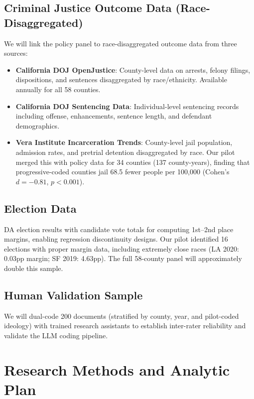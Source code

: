 \documentclass[12pt]{article}
\begin{document}
\subsection{Criminal Justice Outcome Data (Race-Disaggregated)}

We will link the policy panel to race-disaggregated outcome data from three sources:

\begin{itemize}
    \item \textbf{California DOJ OpenJustice}: County-level data on arrests, felony filings, dispositions, and sentences disaggregated by race/ethnicity. Available annually for all 58 counties.
    \item \textbf{California DOJ Sentencing Data}: Individual-level sentencing records including offense, enhancements, sentence length, and defendant demographics.
    \item \textbf{Vera Institute Incarceration Trends}: County-level jail population, admission rates, and pretrial detention disaggregated by race. Our pilot merged this with policy data for 34 counties (137 county-years), finding that progressive-coded counties jail 68.5 fewer people per 100,000 (Cohen's $d = -0.81$, $p < 0.001$).
\end{itemize}

\subsection{Election Data}

DA election results with candidate vote totals for computing 1st--2nd place margins, enabling regression discontinuity designs. Our pilot identified 16 elections with proper margin data, including extremely close races (LA 2020: 0.03pp margin; SF 2019: 4.63pp). The full 58-county panel will approximately double this sample.

\subsection{Human Validation Sample}

We will dual-code 200 documents (stratified by county, year, and pilot-coded ideology) with trained research assistants to establish inter-rater reliability and validate the LLM coding pipeline.

\section{Research Methods and Analytic Plan}
\end{document}
